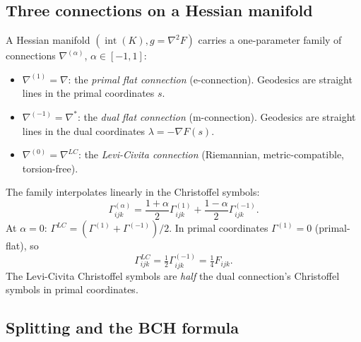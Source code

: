 \documentclass[11pt]{article}
\begin{document}
\subsection{Three connections on a Hessian manifold}

A Hessian manifold $(\operatorname{int}(K), g = \nabla^2 F)$ carries a
one-parameter family of connections $\nabla^{(\alpha)}$, $\alpha \in [-1, 1]$:
\begin{itemize}
  \item $\nabla^{(1)} = \nabla$: the \emph{primal flat connection} (e-connection).
    Geodesics are straight lines in the primal coordinates $s$.
  \item $\nabla^{(-1)} = \nabla^*$: the \emph{dual flat connection} (m-connection).
    Geodesics are straight lines in the dual coordinates $\lambda = -\nabla F(s)$.
  \item $\nabla^{(0)} = \nabla^{LC}$: the \emph{Levi-Civita connection}
    (Riemannian, metric-compatible, torsion-free).
\end{itemize}
The family interpolates linearly in the Christoffel symbols:
\begin{equation}\label{eq:alpha-connection}
  \Gamma^{(\alpha)}_{ijk} = \frac{1+\alpha}{2} \Gamma^{(1)}_{ijk}
    + \frac{1-\alpha}{2} \Gamma^{(-1)}_{ijk}.
\end{equation}
At $\alpha = 0$: $\Gamma^{LC} = (\Gamma^{(1)} + \Gamma^{(-1)})/2$.
In primal coordinates $\Gamma^{(1)} = 0$ (primal-flat), so
\begin{equation}\label{eq:lc-half-dual}
  \Gamma^{LC}_{ijk} = \tfrac{1}{2} \Gamma^{(-1)}_{ijk}
    = \tfrac{1}{4} F_{ijk}.
\end{equation}
The Levi-Civita Christoffel symbols are \emph{half} the dual connection's
Christoffel symbols in primal coordinates.

\subsection{Splitting and the BCH formula}
\end{document}

